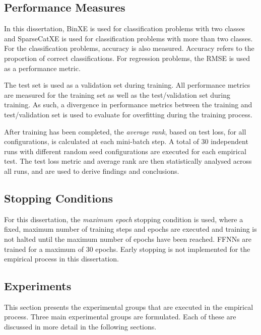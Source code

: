 \subsection{Performance Measures}\label{sec:methodology:performance_measures}

In this dissertation, \acs{BinXE} is used for classification problems with two classes and \acs{SparseCatXE} is used for classification problems with more than two classes. For the classification problems, accuracy is also measured. Accuracy refers to the proportion of correct classifications. For regression problems, the \acs{RMSE} is used as a performance metric.

The test set is used as a validation set during training. All performance metrics are measured for the training set as well as the test/validation set during training. As such, a divergence in performance metrics between the training and test/validation set is used to evaluate for overfitting during the training process.

After training has been completed, the \textit{average rank}, based on test loss, for all configurations, is calculated at each mini-batch step. A total of 30 independent runs with different random seed configurations are executed for each empirical test. The test loss metric and average rank are then statistically analysed across all runs, and are used to derive findings and conclusions.

\subsection{Stopping Conditions}\label{sec:methodology:stopping_conditions}

For this dissertation, the \textit{maximum epoch} stopping condition is used, where a fixed, maximum number of training steps and epochs are executed and training is not halted until the maximum number of epochs have been reached. \acp{FFNN} are trained for a maximum of 30 epochs. Early stopping is not implemented for the empirical process in this dissertation.


\subsection{Experiments}
\label{sec:methodology:experiments}

This section presents the experimental groups that are executed in the empirical process. Three main experimental groups are formulated. Each of these are discussed in more detail in the following sections.


